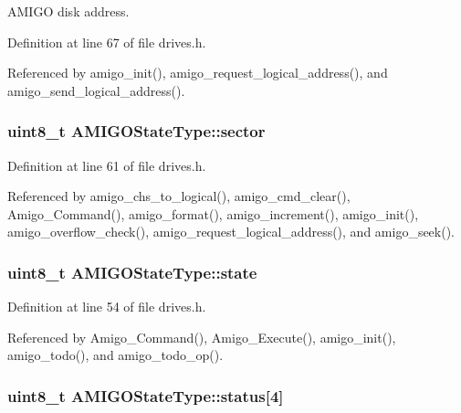 A\+M\+I\+GO disk address. 



Definition at line 67 of file drives.\+h.



Referenced by amigo\+\_\+init(), amigo\+\_\+request\+\_\+logical\+\_\+address(), and amigo\+\_\+send\+\_\+logical\+\_\+address().

\subsubsection[{\texorpdfstring{sector}{sector}}]{\setlength{\rightskip}{0pt plus 5cm}uint8\+\_\+t A\+M\+I\+G\+O\+State\+Type\+::sector}\hypertarget{structAMIGOStateType_a90615dad99e4fb6852b176bf6712f40b}{}\label{structAMIGOStateType_a90615dad99e4fb6852b176bf6712f40b}


Definition at line 61 of file drives.\+h.



Referenced by amigo\+\_\+chs\+\_\+to\+\_\+logical(), amigo\+\_\+cmd\+\_\+clear(), Amigo\+\_\+\+Command(), amigo\+\_\+format(), amigo\+\_\+increment(), amigo\+\_\+init(), amigo\+\_\+overflow\+\_\+check(), amigo\+\_\+request\+\_\+logical\+\_\+address(), and amigo\+\_\+seek().

\subsubsection[{\texorpdfstring{state}{state}}]{\setlength{\rightskip}{0pt plus 5cm}uint8\+\_\+t A\+M\+I\+G\+O\+State\+Type\+::state}\hypertarget{structAMIGOStateType_ab3ba7202566a784c93d437960f8f332e}{}\label{structAMIGOStateType_ab3ba7202566a784c93d437960f8f332e}


Definition at line 54 of file drives.\+h.



Referenced by Amigo\+\_\+\+Command(), Amigo\+\_\+\+Execute(), amigo\+\_\+init(), amigo\+\_\+todo(), and amigo\+\_\+todo\+\_\+op().

\subsubsection[{\texorpdfstring{status}{status}}]{\setlength{\rightskip}{0pt plus 5cm}uint8\+\_\+t A\+M\+I\+G\+O\+State\+Type\+::status\mbox{[}4\mbox{]}}\hypertarget{structAMIGOStateType_a20ecb3cbbcb1fe4746c2d38edc125412}{}\label{structAMIGOStateType_a20ecb3cbbcb1fe4746c2d38edc125412}


